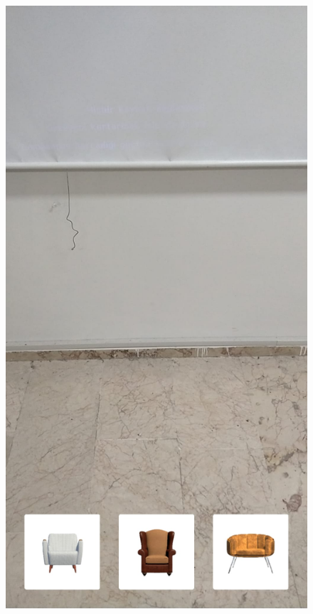 \documentclass[12pt, a4paper]{article}
\begin{document}
	\begin{figure}[!htb]
		
		\begin{minipage}{0.48\textwidth}
			\centering
			\includegraphics[width=.7\linewidth]{koltuk.jpeg}
			\caption{}\label{Fig:Data1}
		\end{minipage}\hfill
		\begin{minipage}{0.48\textwidth}
			\centering

\end{minipage}
\end{figure}
\end{document}
